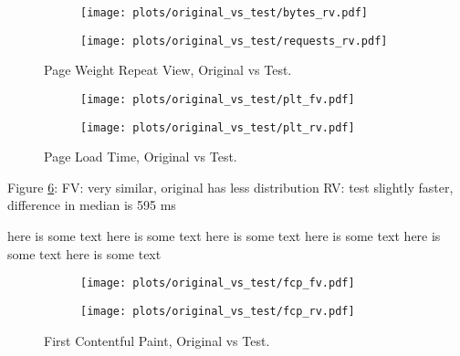 \begin{figure}
	\centering
	\begin{subfigure}{.5\textwidth}
		\centering
		\texttt{[image: plots/original\_vs\_test/bytes\_rv.pdf]}
		\label{fig:sub1}
	\end{subfigure}%
	\begin{subfigure}{.5\textwidth}
		\centering
		\texttt{[image: plots/original\_vs\_test/requests\_rv.pdf]}
		\label{fig:sub2}
	\end{subfigure}
	\caption{Page Weight Repeat View, Original vs Test.}
	\label{figure:plt_original_test}
\end{figure}



\clearpage


\begin{figure}
	\centering
	\begin{subfigure}{.5\textwidth}
		\centering
		\texttt{[image: plots/original\_vs\_test/plt\_fv.pdf]}
		\label{fig:sub1}
	\end{subfigure}%
	\begin{subfigure}{.5\textwidth}
		\centering
		\texttt{[image: plots/original\_vs\_test/plt\_rv.pdf]}
		\label{fig:sub2}
	\end{subfigure}
	\caption{Page Load Time, Original vs Test.}
	\label{figure:plt_original_test}
\end{figure}

Figure \ref{figure:plt_original_test}:
FV: very similar, original has less distribution
RV: test slightly faster, difference in median is 595 ms 

here is some text here is some text here is some text here is some text here is some text here is some text 


\begin{figure}
	\centering
	\begin{subfigure}{.5\textwidth}
		\centering
		\texttt{[image: plots/original\_vs\_test/fcp\_fv.pdf]}
		\label{fig:sub1}
	\end{subfigure}%
	\begin{subfigure}{.5\textwidth}
		\centering
		\texttt{[image: plots/original\_vs\_test/fcp\_rv.pdf]}
		\label{fig:sub2}
	\end{subfigure}
	\caption{First Contentful Paint, Original vs Test.}
	\label{figure:fcp_original_test}
\end{figure}

